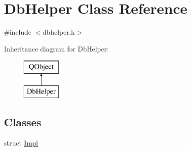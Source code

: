 \hypertarget{class_db_helper}{}\section{Db\+Helper Class Reference}
\label{class_db_helper}


{\ttfamily \#include $<$dbhelper.\+h$>$}

Inheritance diagram for Db\+Helper\+:\begin{figure}[H]
\begin{center}
\leavevmode
\includegraphics[height=2.000000cm]{d2/d3d/class_db_helper}
\end{center}
\end{figure}
\subsection*{Classes}
\begin{DoxyCompactItemize}
\item 
struct \mbox{\hyperlink{struct_db_helper_1_1_impl}{Impl}}
\end{DoxyCompactItemize}
